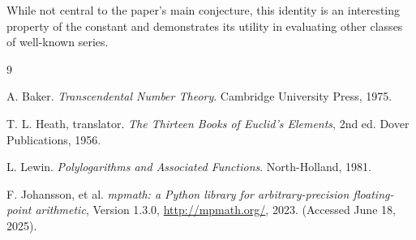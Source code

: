 \documentclass{amsart}
\theoremstyle{plain}
\theoremstyle{definition}
\theoremstyle{remark}
\begin{document}
While not central to the paper's main conjecture, this identity is an interesting property of the constant and demonstrates its utility in evaluating other classes of well-known series.

\begin{thebibliography}{9}

A. Baker. \textit{Transcendental Number Theory}. Cambridge University Press, 1975. 

T. L. Heath, translator. \textit{The Thirteen Books of Euclid's Elements}, 2nd ed. Dover Publications, 1956. 

L. Lewin. \textit{Polylogarithms and Associated Functions}. North-Holland, 1981. 

F. Johansson, et al. \textit{mpmath: a Python library for arbitrary-precision floating-point arithmetic}, Version 1.3.0, \url{http://mpmath.org/}, 2023. (Accessed June 18, 2025).

\end{thebibliography}
\end{document}
